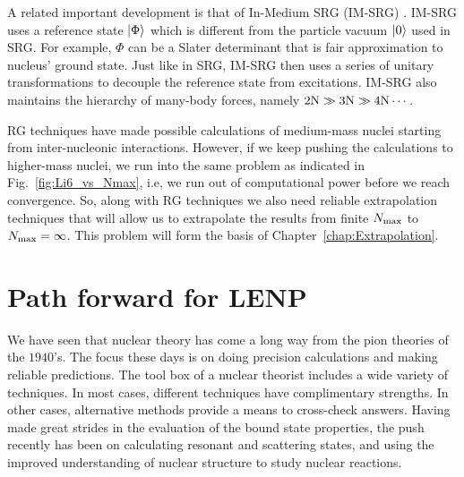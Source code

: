 	A related important development is that of In-Medium SRG (IM-SRG)
	\cite{Hergert:2015awm}.  IM-SRG uses a reference state ${|\Phi\rangle}$ which is
	different from the particle vacuum ${|0\rangle}$ used in SRG.
	For example, $\Phi$ can be a Slater determinant that is fair
	approximation to nucleus' ground state.  Just like in SRG,
	IM-SRG then uses a series of unitary transformations to decouple the
	reference state from excitations.  IM-SRG also maintains the hierarchy of
	many-body forces, namely ${\rm 2N} \gg {\rm 3N} \gg {\rm 4 N} \cdots$.

	RG techniques have made possible calculations of medium-mass nuclei starting
	from inter-nucleonic interactions.  However, if we keep pushing the
	calculations to higher-mass nuclei, we run into the same problem as
	indicated in Fig.~\ref{fig:Li6_vs_Nmax}, i.e, we run out of
	computational power before we reach convergence.
	So, along with RG techniques we also need reliable extrapolation
	techniques that will allow us to extrapolate the results from
	finite ${N_{\mathrm{max}}}$ to ${N_{\mathrm{max}}} = \infty$.  This problem will
	form the basis of Chapter~\ref{chap:Extrapolation}.


	\section{Path forward for LENP}

	We have seen that nuclear theory has come a long way from the pion theories
	of the $1940$'s.  The focus these days is on doing precision calculations and
	making reliable predictions.
	The tool box of a nuclear theorist includes a wide variety of
	techniques.  In most cases, different techniques have complimentary
	strengths.  In other cases, alternative methods provide a means to
	cross-check answers.
	Having made great strides in the evaluation
	of the bound state properties, the push recently has been on
	calculating resonant and scattering states, and using the improved
	understanding of nuclear structure to study nuclear reactions.

